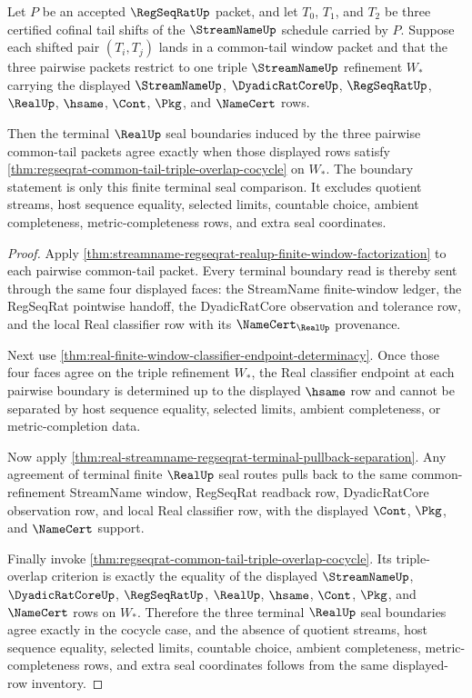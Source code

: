 \begin{theorem}
\label{thm:real-terminal-common-tail-cocycle-boundary}
Let $P$ be an accepted $\RegSeqRatUp$ packet, and let $T_0$, $T_1$, and
$T_2$ be three certified cofinal tail shifts of the $\StreamNameUp$ schedule
carried by $P$. Suppose each shifted pair $(T_i,T_j)$ lands in a common-tail
window packet and that the three pairwise packets restrict to one triple
$\StreamNameUp$ refinement $W_\ast$ carrying the displayed
$\StreamNameUp$, $\DyadicRatCoreUp$, $\RegSeqRatUp$, $\RealUp$, $\hsame$,
$\Cont$, $\Pkg$, and $\NameCert$ rows.

Then the terminal $\RealUp$ seal boundaries induced by the three pairwise
common-tail packets agree exactly when those displayed rows satisfy
\autoref{thm:regseqrat-common-tail-triple-overlap-cocycle} on $W_\ast$.
The boundary statement is only this finite terminal seal comparison. It
excludes quotient streams, host sequence equality, selected limits, countable
choice, ambient completeness, metric-completeness rows, and extra seal
coordinates.
\end{theorem}
\begin{proof}
Apply \autoref{thm:streamname-regseqrat-realup-finite-window-factorization}
to each pairwise common-tail packet. Every terminal boundary read is thereby
sent through the same four displayed faces: the StreamName finite-window
ledger, the RegSeqRat pointwise handoff, the DyadicRatCore observation and
tolerance row, and the local Real classifier row with its
$\NameCert_{\RealUp}$ provenance.

Next use \autoref{thm:real-finite-window-classifier-endpoint-determinacy}.
Once those four faces agree on the triple refinement $W_\ast$, the Real
classifier endpoint at each pairwise boundary is determined up to the
displayed $\hsame$ row and cannot be separated by host sequence equality,
selected limits, ambient completeness, or metric-completion data.

Now apply
\autoref{thm:real-streamname-regseqrat-terminal-pullback-separation}. Any
agreement of terminal finite $\RealUp$ seal routes pulls back to the same
common-refinement StreamName window, RegSeqRat readback row, DyadicRatCore
observation row, and local Real classifier row, with the displayed $\Cont$,
$\Pkg$, and $\NameCert$ support.

Finally invoke
\autoref{thm:regseqrat-common-tail-triple-overlap-cocycle}. Its
triple-overlap criterion is exactly the equality of the displayed
$\StreamNameUp$, $\DyadicRatCoreUp$, $\RegSeqRatUp$, $\RealUp$, $\hsame$,
$\Cont$, $\Pkg$, and $\NameCert$ rows on $W_\ast$. Therefore the three
terminal $\RealUp$ seal boundaries agree exactly in the cocycle case, and
the absence of quotient streams, host sequence equality, selected limits,
countable choice, ambient completeness, metric-completeness rows, and extra
seal coordinates follows from the same displayed-row inventory.
\end{proof}
